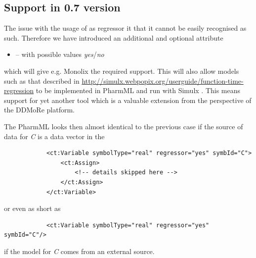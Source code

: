 \subsection{Support in 0.7 version}
The issue with the usage of  as regressor it that it cannot be 
easily recognised as such. Therefore we have introduced an additional and optional 
attribute
\begin{itemize}
\item 
{} -- with possible values \emph{yes}/\emph{no} 
\end{itemize}
which will give e.g. Monolix the required support. This will also allow models such as 
that described in \url{http://simulx.webpopix.org/userguide/function-time-regression}
to be implemented in PharmML and run with Simulx .
This means support for yet another tool which is a valuable extension from the
perspective of the DDMoRe platform. 

The PharmML looks then almost identical to the previous case if the source of
data for \emph{C} is a data vector in the 
\lstset{language=XML}
\begin{lstlisting}
            <ct:Variable symbolType="real" regressor="yes" symbId="C">
                <ct:Assign>
                    <!-- details skipped here -->
                </ct:Assign>
            </ct:Variable>
\end{lstlisting}
or even as short as
\lstset{language=XML}
\begin{lstlisting}
            <ct:Variable symbolType="real" regressor="yes" symbId="C"/>
\end{lstlisting}
if the model for \emph{C} comes from an external source.


